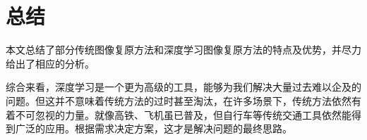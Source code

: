 \documentclass[UTF8]{ctexart}
\begin{document}
        

            


	\section{总结}
		\indent 本文总结了部分传统图像复原方法和深度学习图像复原方法的特点及优势，并尽力给出了相应的分析。
        
        \indent 综合来看，深度学习是一个更为高级的工具，能够为我们解决大量过去难以企及的问题。但这并不意味着传统方法的过时甚至淘汰，在许多场景下，传统方法依然有着不可忽视的力量。就像高铁、飞机虽已普及，但自行车等传统交通工具依然能得到广泛的应用。根据需求决定方案，这才是解决问题的最终思路。
		

		
	
	
%
%

\end{document}
